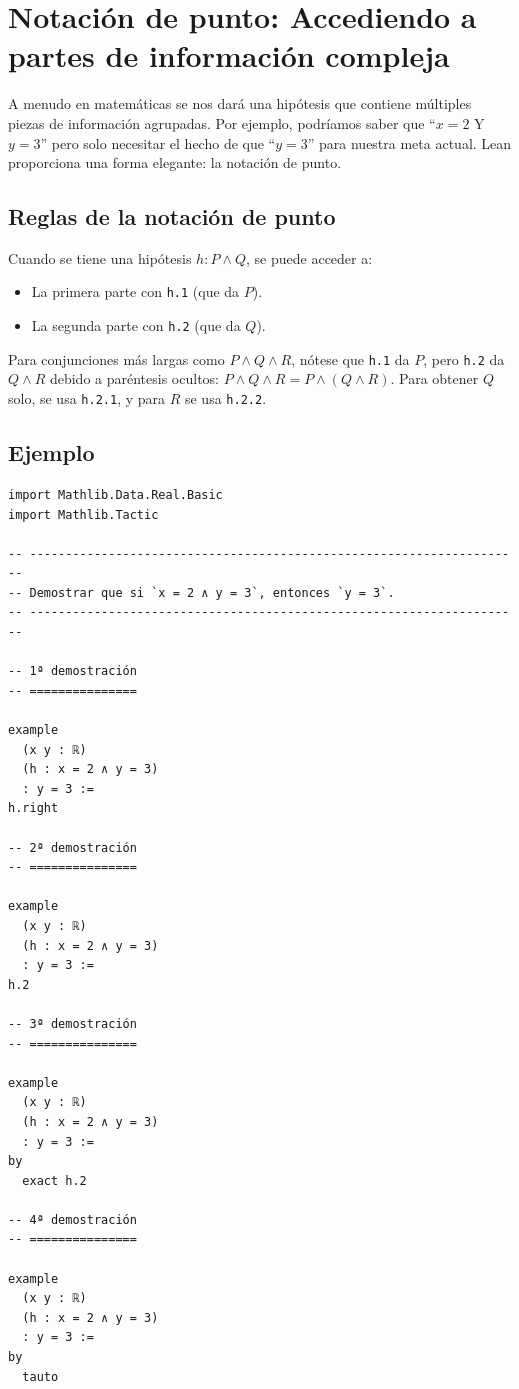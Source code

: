 \section{Notación de punto: Accediendo a partes de información compleja}

A menudo en matemáticas se nos dará una hipótesis que contiene múltiples
piezas de información agrupadas. Por ejemplo, podríamos saber que ``$x=2$
Y $y=3$'' pero solo necesitar el hecho de que ``$y=3$'' para nuestra meta
actual. Lean proporciona una forma elegante: la notación de punto.

\subsection{Reglas de la notación de punto}

Cuando se tiene una hipótesis $h : P \wedge Q$, se puede acceder a:
\begin{itemize}
  \item La primera parte con \texttt{h.1} (que da $P$).
  \item La segunda parte con \texttt{h.2} (que da $Q$).
\end{itemize}

Para conjunciones más largas como $P \wedge Q \wedge R$, nótese que
\texttt{h.1} da $P$, pero \texttt{h.2} da $Q \wedge R$ debido a paréntesis
ocultos: $P \wedge Q \wedge R = P \wedge (Q \wedge R)$. Para obtener $Q$
solo, se usa \texttt{h.2.1}, y para $R$ se usa \texttt{h.2.2}.

\subsection{Ejemplo}

\begin{verbatim}
import Mathlib.Data.Real.Basic
import Mathlib.Tactic

-- ---------------------------------------------------------------------
-- Demostrar que si `x = 2 ∧ y = 3`, entonces `y = 3`.
-- ---------------------------------------------------------------------

-- 1ª demostración
-- ===============

example
  (x y : ℝ)
  (h : x = 2 ∧ y = 3)
  : y = 3 :=
h.right

-- 2ª demostración
-- ===============

example
  (x y : ℝ)
  (h : x = 2 ∧ y = 3)
  : y = 3 :=
h.2

-- 3ª demostración
-- ===============

example
  (x y : ℝ)
  (h : x = 2 ∧ y = 3)
  : y = 3 :=
by
  exact h.2

-- 4ª demostración
-- ===============

example
  (x y : ℝ)
  (h : x = 2 ∧ y = 3)
  : y = 3 :=
by
  tauto
\end{verbatim}

